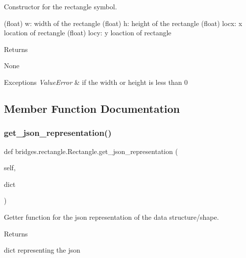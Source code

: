 Constructor for the rectangle symbol. 

(float) w\+: width of the rectangle (float) h\+: height of the rectangle (float) locx\+: x location of rectangle (float) locy\+: y loaction of rectangle \begin{DoxyReturn}{Returns}


None
\end{DoxyReturn}

\begin{DoxyExceptions}{Exceptions}
{\em Value\+Error} & if the width or height is less than 0 \\
\hline
\end{DoxyExceptions}


\subsection{Member Function Documentation}
\mbox{\label{classbridges_1_1rectangle_1_1_rectangle_abed807aa2b797312357395f874577a64}} 
\subsubsection{\texorpdfstring{get\+\_\+json\+\_\+representation()}{get\_json\_representation()}}
{\footnotesize\ttfamily def bridges.\+rectangle.\+Rectangle.\+get\+\_\+json\+\_\+representation (\begin{DoxyParamCaption}\item[{}]{self,  }\item[{}]{dict }\end{DoxyParamCaption})}



Getter function for the json representation of the data structure/shape. 

\begin{DoxyReturn}{Returns}


dict representing the json 
\end{DoxyReturn}
\mbox{\label{classbridges_1_1rectangle_1_1_rectangle_ac6a82e131b0fc6f88ede4c9afb106b3a}} 
